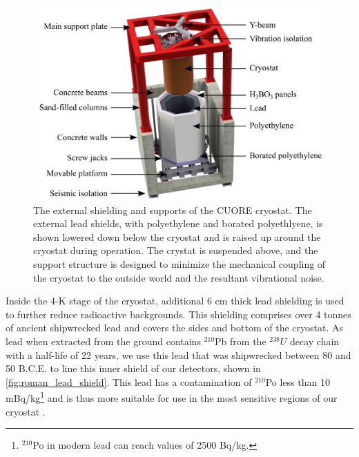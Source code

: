 \begin{figure}
    \centering
    \includegraphics[width=\linewidth]{Figures/Hut_ShieldingDown_02.pdf}
    \caption[The external shielding and supports of the CUORE cryostat.]
    {The external shielding and supports of the CUORE cryostat.
    The external lead shields, with polyethylene and borated polyethlyene, is shown lowered down below the cryostat and is raised up around the cryostat during operation.
    The crystat is suspended above, and the support structure is designed to minimize the mechanical coupling of the cryostat to the outside world and the resultant vibrational noise.}
    \label{fig:external_shielding}
\end{figure}
Inside the 4-K stage of the cryostat, additional 6 cm thick lead shielding is used to further reduce radioactive backgrounds. This shielding comprises over 4 tonnes of ancient shipwrecked lead \cite{roman_lead} and covers the sides and bottom of the cryostat.
As lead when extracted from the ground contains $^{210}$Pb from the $^{238}U$ decay chain with a half-life of 22 years, we use this lead that was shipwrecked between 80 and 50 B.C.E. to line this inner shield of our detectors, shown in \autoref{fig:roman_lead_shield}.
This lead has a contamination of $^{210}$Po less than 10 mBq/kg\footnote{$^{210}$Po in modern lead can reach values of 2500 Bq/kg.} and is thus more suitable for use in the most sensitive regions of our cryostat \cite{ALESSANDRELLO1998163}.  
